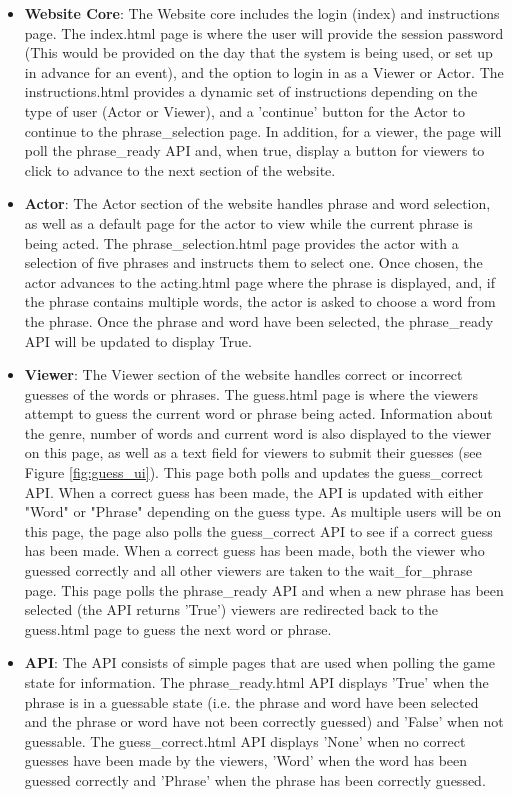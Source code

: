 \begin{itemize}

	\item \textbf{Website Core}: The Website core includes the login (index) and instructions page. The index.html page is where the user will provide the session password (This would be provided on the day that the system is being used, or set up in advance for an event), and the option to login in as a Viewer or Actor. The instructions.html provides a dynamic set of instructions depending on the type of user (Actor or Viewer), and a 'continue' button for the Actor to continue to the phrase\_selection page. In addition, for a viewer, the page will poll the phrase\_ready API and, when true, display a button for viewers to click to advance to the next section of the website.
	
	\item \textbf{Actor}: The Actor section of the website handles phrase and word selection, as well as a default page for the actor to view while the current phrase is being acted. The phrase\_selection.html page provides the actor with a selection of five phrases and instructs them to select one. Once chosen, the actor advances to the acting.html page where the phrase is displayed, and, if the phrase contains multiple words, the actor is asked to choose a word from the phrase. Once the phrase and word have been selected, the phrase\_ready API will be updated to display True.
	
	\item \textbf{Viewer}: The Viewer section of the website handles correct or incorrect guesses of the words or phrases. The  guess.html page is where the viewers attempt to guess the current word or phrase being acted. Information about the genre, number of words and current word is also displayed to the viewer on this page, as well as a text field for viewers to submit their guesses (see Figure \ref{fig:guess_ui}). This page both polls and updates the guess\_correct API. When a correct guess has been made, the API is updated with either "Word" or "Phrase" depending on the guess type. As multiple users will be on this page, the page also polls the guess\_correct API to see if a correct guess has been made. When a correct guess has been made, both the viewer who guessed correctly and all other viewers are taken to the wait\_for\_phrase page. This page polls the phrase\_ready API and when a new phrase has been selected (the API returns 'True') viewers are redirected back to the guess.html page to guess the next word or phrase.
	
	\item \textbf{API}: The API consists of simple pages that are used when polling the game state for information. The phrase\_ready.html API displays 'True' when the phrase is in a guessable state (i.e. the phrase and word have been selected and the phrase or word have not been correctly guessed) and 'False' when not guessable. The guess\_correct.html API displays 'None' when no correct guesses have been made by the viewers, 'Word' when the word has been guessed correctly and 'Phrase' when the phrase has been correctly guessed.
	
\end{itemize}

